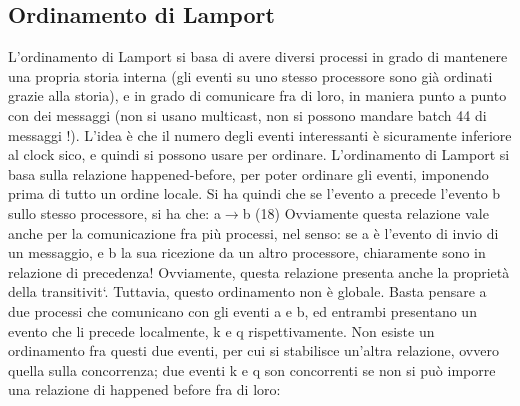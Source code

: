 \subsection{Ordinamento di Lamport}
L'ordinamento di Lamport si basa di avere diversi processi in grado di mantenere
una propria storia interna (gli eventi su uno stesso processore sono già ordinati
grazie alla storia), e in grado di comunicare fra di loro, in maniera punto a
punto con dei messaggi (non si usano multicast, non si possono mandare batch
44
di messaggi !). L'idea è che il numero degli eventi interessanti è sicuramente
inferiore al clock sico, e quindi si possono usare per ordinare.
L'ordinamento di Lamport si basa sulla relazione happened-before, per poter
ordinare gli eventi, imponendo prima di tutto un ordine locale. Si ha quindi che
se l'evento a precede l'evento b sullo stesso processore, si ha che:
a$\rightarrow$b
(18)
Ovviamente questa relazione vale anche per la comunicazione fra più processi,
nel senso: se a è l'evento di invio di un messaggio, e b la sua ricezione da un altro
processore, chiaramente sono in relazione di precedenza! Ovviamente, questa
relazione presenta anche la proprietà della transitivit`.
Tuttavia, questo ordinamento non è globale. Basta pensare a due processi che
comunicano con gli eventi a e b, ed entrambi presentano un evento che li precede
localmente, k e q rispettivamente. Non esiste un ordinamento fra questi due
eventi, per cui si stabilisce un'altra relazione, ovvero quella sulla concorrenza;
due eventi k e q son concorrenti se non si può imporre una relazione di happened
before fra di loro:
